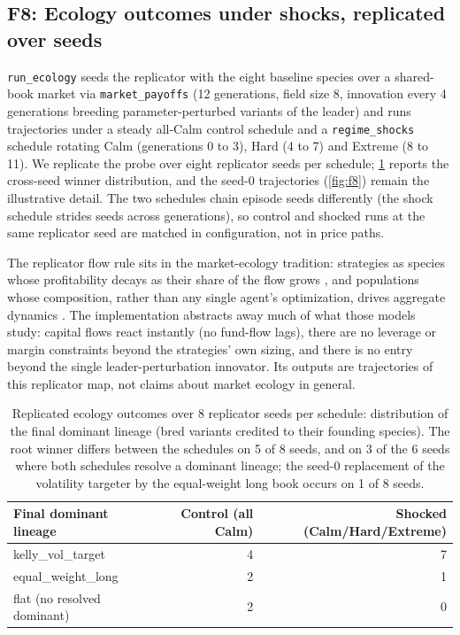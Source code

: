 \subsection{F8: Ecology outcomes under shocks, replicated over seeds}\label{sec:f8}

\texttt{run\_ecology} seeds the replicator with the eight baseline species over a shared-book market via \texttt{market\_payoffs} (12 generations, field size 8, innovation every 4 generations breeding parameter-perturbed variants of the leader) and runs trajectories under a steady all-Calm control schedule and a \texttt{regime\_shocks} schedule rotating Calm (generations 0 to 3), Hard (4 to 7) and Extreme (8 to 11). We replicate the probe over eight replicator seeds per schedule; \cref{tab:f8} reports the cross-seed winner distribution, and the seed-0 trajectories (\cref{fig:f8}) remain the illustrative detail. The two schedules chain episode seeds differently (the shock schedule strides seeds across generations), so control and shocked runs at the same replicator seed are matched in configuration, not in price paths.

The replicator flow rule sits in the market-ecology tradition: strategies as species whose profitability decays as their share of the flow grows \citep{farmer2002market}, and populations whose composition, rather than any single agent's optimization, drives aggregate dynamics \citep{lux1999scaling}. The implementation abstracts away much of what those models study: capital flows react instantly (no fund-flow lags), there are no leverage or margin constraints beyond the strategies' own sizing, and there is no entry beyond the single leader-perturbation innovator. Its outputs are trajectories of this replicator map, not claims about market ecology in general.

\begin{table}[t]
\centering
\caption{Replicated ecology outcomes over 8 replicator seeds per schedule: distribution of the final dominant lineage (bred variants credited to their founding species). The root winner differs between the schedules on 5 of 8 seeds, and on 3 of the 6 seeds where both schedules resolve a dominant lineage; the seed-0 replacement of the volatility targeter by the equal-weight long book occurs on 1 of 8 seeds.}
\label{tab:f8}
\footnotesize
\setlength{\tabcolsep}{4pt}
\begin{tabular}{lrr}
\toprule
Final dominant lineage & Control (all Calm) & Shocked (Calm/Hard/Extreme) \\
\midrule
kelly\_vol\_target & 4 & 7 \\
equal\_weight\_long & 2 & 1 \\
flat (no resolved dominant) & 2 & 0 \\
\bottomrule
\end{tabular}
\end{table}

